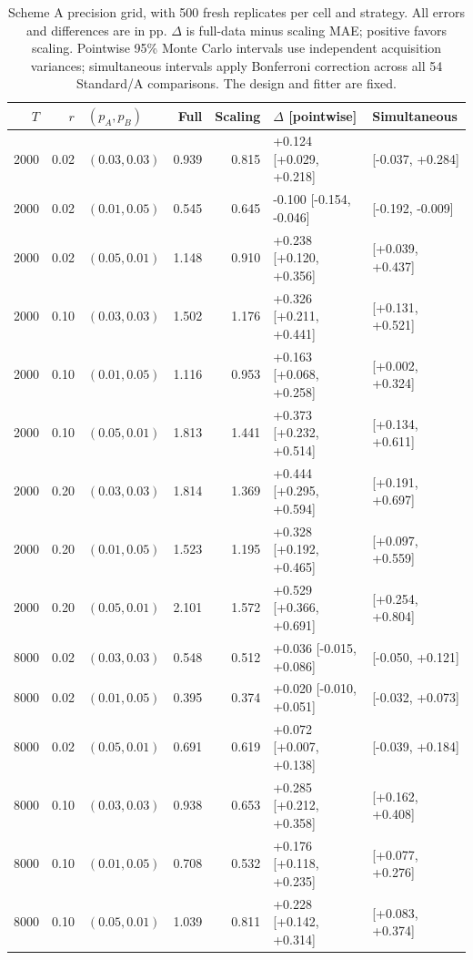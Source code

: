 \begin{table}[!htbp]
\centering
\small\setlength{\tabcolsep}{4pt}
\caption{Scheme A precision grid, with 500 fresh replicates per cell and strategy. All errors and differences are in pp. $\Delta$ is full-data minus scaling MAE; positive favors scaling. Pointwise 95\% Monte Carlo intervals use independent acquisition variances; simultaneous intervals apply Bonferroni correction across all 54 Standard/A comparisons. The design and fitter are fixed.}
\label{tab:precisiona}
\begin{tabular}{@{}rrlrrll@{}}
\toprule
$T$ & $r$ & $(p_A,p_B)$ & Full & Scaling & $\Delta$ [pointwise] & Simultaneous \\
\midrule
2000 & 0.02 & $(0.03,0.03)$ & 0.939 & 0.815 & +0.124 [+0.029, +0.218] & [-0.037, +0.284] \\
2000 & 0.02 & $(0.01,0.05)$ & 0.545 & 0.645 & -0.100 [-0.154, -0.046] & [-0.192, -0.009] \\
2000 & 0.02 & $(0.05,0.01)$ & 1.148 & 0.910 & +0.238 [+0.120, +0.356] & [+0.039, +0.437] \\
2000 & 0.10 & $(0.03,0.03)$ & 1.502 & 1.176 & +0.326 [+0.211, +0.441] & [+0.131, +0.521] \\
2000 & 0.10 & $(0.01,0.05)$ & 1.116 & 0.953 & +0.163 [+0.068, +0.258] & [+0.002, +0.324] \\
2000 & 0.10 & $(0.05,0.01)$ & 1.813 & 1.441 & +0.373 [+0.232, +0.514] & [+0.134, +0.611] \\
2000 & 0.20 & $(0.03,0.03)$ & 1.814 & 1.369 & +0.444 [+0.295, +0.594] & [+0.191, +0.697] \\
2000 & 0.20 & $(0.01,0.05)$ & 1.523 & 1.195 & +0.328 [+0.192, +0.465] & [+0.097, +0.559] \\
2000 & 0.20 & $(0.05,0.01)$ & 2.101 & 1.572 & +0.529 [+0.366, +0.691] & [+0.254, +0.804] \\
8000 & 0.02 & $(0.03,0.03)$ & 0.548 & 0.512 & +0.036 [-0.015, +0.086] & [-0.050, +0.121] \\
8000 & 0.02 & $(0.01,0.05)$ & 0.395 & 0.374 & +0.020 [-0.010, +0.051] & [-0.032, +0.073] \\
8000 & 0.02 & $(0.05,0.01)$ & 0.691 & 0.619 & +0.072 [+0.007, +0.138] & [-0.039, +0.184] \\
8000 & 0.10 & $(0.03,0.03)$ & 0.938 & 0.653 & +0.285 [+0.212, +0.358] & [+0.162, +0.408] \\
8000 & 0.10 & $(0.01,0.05)$ & 0.708 & 0.532 & +0.176 [+0.118, +0.235] & [+0.077, +0.276] \\
8000 & 0.10 & $(0.05,0.01)$ & 1.039 & 0.811 & +0.228 [+0.142, +0.314] & [+0.083, +0.374] \\

\end{tabular}
\end{table}
